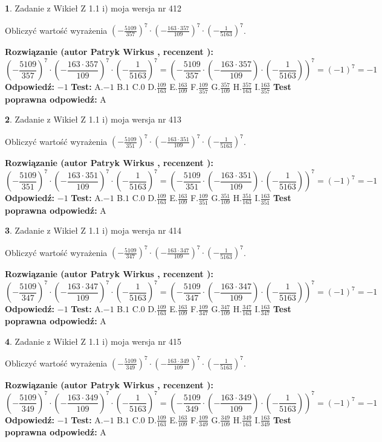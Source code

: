 \documentclass[12pt, a4paper]{article}
\theoremstyle{definition} %
\newtheorem{zad}{}
\newcommand{\zadStart}[1]{\begin{zad}#1\newline}
\newcommand{\zadStop}{\end{zad}}
\newcommand{\rozwStart}[2]{\noindent \textbf{Rozwiązanie (autor #1 , recenzent #2): }\newline}
\newcommand{\rozwStop}{\newline}
\newcommand{\odpStart}{\noindent \textbf{Odpowiedź:}\newline}
\newcommand{\odpStop}{\newline}
\newcommand{\testStart}{\noindent \textbf{Test:}\newline}
\newcommand{\testStop}{\newline}
\newcommand{\kluczStart}{\noindent \textbf{Test poprawna odpowiedź:}\newline}
\newcommand{\kluczStop}{\newline}
\begin{document}
\zadStart{Zadanie z Wikieł Z 1.1 i) moja wersja nr 412}

Obliczyć wartość wyrażenia $(-\frac{5109}{357})^{7} \cdot (-\frac{163 \cdot 357}{109})^{7} \cdot (-\frac{1}{5163})^{7}$.
\zadStop
\rozwStart{Patryk Wirkus}{}
$$(-\frac{5109}{357})^{7} \cdot (-\frac{163 \cdot 357}{109})^{7} \cdot (-\frac{1}{5163})^{7} = (-\frac{5109}{357} \cdot (-\frac{163 \cdot 357}{109}) \cdot (-\frac{1}{5163}))^{7} = (-1)^{7} = -1$$
\rozwStop
\odpStart
$-1$
\odpStop
\testStart
A.$-1$ B.$1$ C.$0$ D.$\frac{109}{163}$ E.$\frac{163}{109}$
F.$\frac{109}{357}$ G.$\frac{357}{109}$
H.$\frac{357}{163}$
I.$\frac{163}{357}$
\testStop
\kluczStart
A
\kluczStop



\zadStart{Zadanie z Wikieł Z 1.1 i) moja wersja nr 413}

Obliczyć wartość wyrażenia $(-\frac{5109}{351})^{7} \cdot (-\frac{163 \cdot 351}{109})^{7} \cdot (-\frac{1}{5163})^{7}$.
\zadStop
\rozwStart{Patryk Wirkus}{}
$$(-\frac{5109}{351})^{7} \cdot (-\frac{163 \cdot 351}{109})^{7} \cdot (-\frac{1}{5163})^{7} = (-\frac{5109}{351} \cdot (-\frac{163 \cdot 351}{109}) \cdot (-\frac{1}{5163}))^{7} = (-1)^{7} = -1$$
\rozwStop
\odpStart
$-1$
\odpStop
\testStart
A.$-1$ B.$1$ C.$0$ D.$\frac{109}{163}$ E.$\frac{163}{109}$
F.$\frac{109}{351}$ G.$\frac{351}{109}$
H.$\frac{351}{163}$
I.$\frac{163}{351}$
\testStop
\kluczStart
A
\kluczStop



\zadStart{Zadanie z Wikieł Z 1.1 i) moja wersja nr 414}

Obliczyć wartość wyrażenia $(-\frac{5109}{347})^{7} \cdot (-\frac{163 \cdot 347}{109})^{7} \cdot (-\frac{1}{5163})^{7}$.
\zadStop
\rozwStart{Patryk Wirkus}{}
$$(-\frac{5109}{347})^{7} \cdot (-\frac{163 \cdot 347}{109})^{7} \cdot (-\frac{1}{5163})^{7} = (-\frac{5109}{347} \cdot (-\frac{163 \cdot 347}{109}) \cdot (-\frac{1}{5163}))^{7} = (-1)^{7} = -1$$
\rozwStop
\odpStart
$-1$
\odpStop
\testStart
A.$-1$ B.$1$ C.$0$ D.$\frac{109}{163}$ E.$\frac{163}{109}$
F.$\frac{109}{347}$ G.$\frac{347}{109}$
H.$\frac{347}{163}$
I.$\frac{163}{347}$
\testStop
\kluczStart
A
\kluczStop



\zadStart{Zadanie z Wikieł Z 1.1 i) moja wersja nr 415}

Obliczyć wartość wyrażenia $(-\frac{5109}{349})^{7} \cdot (-\frac{163 \cdot 349}{109})^{7} \cdot (-\frac{1}{5163})^{7}$.
\zadStop
\rozwStart{Patryk Wirkus}{}
$$(-\frac{5109}{349})^{7} \cdot (-\frac{163 \cdot 349}{109})^{7} \cdot (-\frac{1}{5163})^{7} = (-\frac{5109}{349} \cdot (-\frac{163 \cdot 349}{109}) \cdot (-\frac{1}{5163}))^{7} = (-1)^{7} = -1$$
\rozwStop
\odpStart
$-1$
\odpStop
\testStart
A.$-1$ B.$1$ C.$0$ D.$\frac{109}{163}$ E.$\frac{163}{109}$
F.$\frac{109}{349}$ G.$\frac{349}{109}$
H.$\frac{349}{163}$
I.$\frac{163}{349}$
\testStop
\kluczStart
A
\kluczStop
\end{document}
